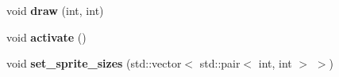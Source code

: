 \begin{DoxyCompactItemize}
\item 
void {\bfseries draw} (int, int)\hypertarget{classengine_1_1_animation_a6fc9f67fd4aa3bc6a26f0a2d98015938}{}\label{classengine_1_1_animation_a6fc9f67fd4aa3bc6a26f0a2d98015938}

\item 
void {\bfseries activate} ()\hypertarget{classengine_1_1_animation_aed8e1d2ca377855e1098fb9491e67ae4}{}\label{classengine_1_1_animation_aed8e1d2ca377855e1098fb9491e67ae4}

\item 
void {\bfseries set\+\_\+sprite\+\_\+sizes} (std\+::vector$<$ std\+::pair$<$ int, int $>$ $>$)\hypertarget{classengine_1_1_animation_a5af8b9eb0bf5f6e6c87a9a03fdefac5c}{}\label{classengine_1_1_animation_a5af8b9eb0bf5f6e6c87a9a03fdefac5c}

\end{DoxyCompactItemize}
